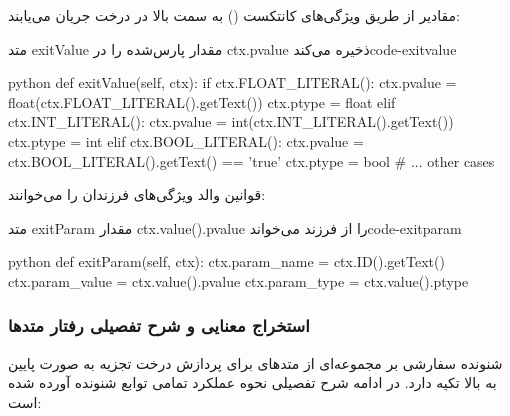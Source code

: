 \documentclass{nngraph-fa}
\begin{document}
مقادیر از طریق ویژگی‌های کانتکست () به سمت بالا در درخت جریان می‌یابند:

\begin{codebox}{متد exitValue مقدار پارس‌شده را در ctx.pvalue ذخیره می‌کند}{code-exitvalue}
\begin{amzcode}{python}
def exitValue(self, ctx):
    if ctx.FLOAT_LITERAL():
        ctx.pvalue = float(ctx.FLOAT_LITERAL().getText())
        ctx.ptype  = float
    elif ctx.INT_LITERAL():
        ctx.pvalue = int(ctx.INT_LITERAL().getText())
        ctx.ptype  = int
    elif ctx.BOOL_LITERAL():
        ctx.pvalue = ctx.BOOL_LITERAL().getText() == 'true'
        ctx.ptype  = bool
    # ... other cases
\end{amzcode}
\end{codebox}

قوانین والد ویژگی‌های فرزندان را می‌خوانند:

\begin{codebox}{متد exitParam مقدار ctx.value().pvalue را از فرزند می‌خواند}{code-exitparam}
\begin{amzcode}{python}
def exitParam(self, ctx):
    ctx.param_name  = ctx.ID().getText()
    ctx.param_value = ctx.value().pvalue
    ctx.param_type  = ctx.value().ptype
\end{amzcode}
\end{codebox}

\subsubsection{استخراج معنایی و شرح تفصیلی رفتار متدها}

شنونده سفارشی بر مجموعه‌ای از متدهای  برای پردازش درخت تجزیه به صورت پایین به بالا تکیه دارد. در ادامه شرح تفصیلی نحوه عملکرد تمامی توابع شنونده آورده شده است:
\end{document}
